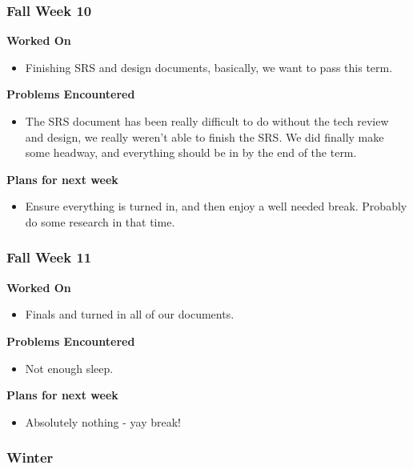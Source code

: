 \documentclass[compsoc,draftclsnofoot,onecolumn,10pt]{IEEEtran}
\begin{document}
\subsubsection*{Fall Week 10}
\textbf{Worked On}
\begin{itemize}
    \item Finishing SRS and design documents, basically, we want to pass this term.
\end{itemize}
\textbf{Problems Encountered}
\begin{itemize}
    \item The SRS document has been really difficult to do without the tech review and design, we really weren't able to finish the SRS. We did finally make some headway, and everything should be in by the end of the term. 
\end{itemize}
\textbf{Plans for next week}
\begin{itemize}
    \item Ensure everything is turned in, and then enjoy a well needed break. Probably do some research in that time. 
\end{itemize}



\subsubsection*{Fall Week 11}
\textbf{Worked On}
\begin{itemize}
    \item Finals and turned in all of our documents. 
\end{itemize}
\textbf{Problems Encountered}
\begin{itemize}
    \item Not enough sleep.
\end{itemize}
\textbf{Plans for next week}
\begin{itemize}
    \item Absolutely nothing - yay break!
\end{itemize}


\subsubsection{Winter}
\end{document}
